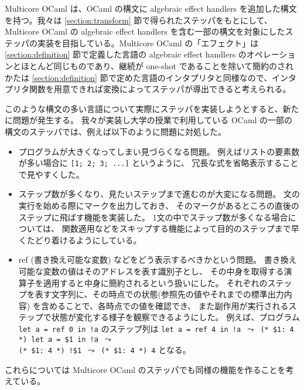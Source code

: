 Multicore OCaml は、OCaml の構文に algebraic effect handlers を追加した構文を持つ。我々は \ref{section:transform} 節で得られたステッパをもとにして、Multicore OCaml の algebraic effect handlers を含む一部の構文を対象にしたステッパの実装を目指している。Multicore OCaml の「エフェクト」は \ref{section:definition} 節で定義した言語の algebraic effect handlers のオペレーションとほとんど同じものであり、継続が one-shot であることを除いて簡約のされかたは \ref{section:definition} 節で定めた言語のインタプリタと同様なので、インタプリタ関数を用意できれば変換によってステッパが導出できると考えられる。

このような構文の多い言語について実際にステッパを実装しようとすると、新たに問題が発生する。
我々が実装し大学の授業で利用している OCaml の一部の構文のステッパでは、例えば以下のように問題に対処した。
\begin{itemize}
\item プログラムが大きくなってしまい見づらくなる問題。
例えばリストの要素数が多い場合に \texttt{[1; 2; 3; ...]} というように、
冗長な式を省略表示することで見やすくした。
\item ステップ数が多くなり、見たいステップまで進むのが大変になる問題。
文の実行を始める際にマークを出力しておき、
そのマークがあるところの直後のステップに飛ばす機能を実装した。
1文の中でステップ数が多くなる場合については、
関数適用などをスキップする機能によって目的のステップまで早くたどり着けるようにしている。
\item ref (書き換え可能な変数) などをどう表示するべきかという問題。
書き換え可能な変数の値はそのアドレスを表す識別子とし、
その中身を取得する演算子を適用すると中身に簡約されるという扱いにした。
それぞれのステップを表す文字列に、その時点での状態(参照先の値やそれまでの標準出力内容)
を含めることで、各時点での値を確認でき、
また副作用が実行されるステップで状態が変化する様子を観察できるようにした。
例えば、プログラム \texttt{let a = ref 0 in !a} のステップ列は
\texttt{let a = ref 4 in !a $\leadsto$ (* \$1:\ 4 *) let a = \$1 in !a
$\leadsto$ \\(* \$1:\ 4 *) !\$1 $\leadsto$ (* \$1:\ 4 *) 4} となる。
\end{itemize}
これらについては Multicore OCaml のステッパでも同様の機能を作ることを考えている。

